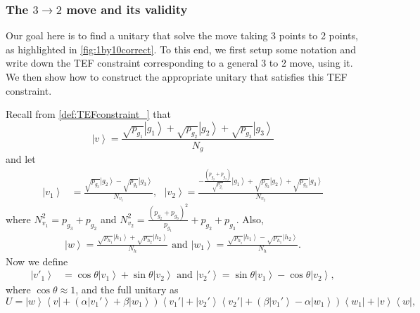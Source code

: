 \documentclass{theoretics}
\newcommand{\atul}[1]{#1} %
\begin{document}
\subsubsection{The \texorpdfstring{$3\to2$}{3 -> 2} move and its validity}\label{subsubsec:3to2}
\atul{Our goal here is to find a unitary that solve the move taking 3 points to 2 points, as highlighted in  \cref{fig:1by10correct}. To this end, we first setup some notation and write down the TEF constraint corresponding to a general 3 to 2 move, using it. We then show how to construct the appropriate unitary that satisfies this TEF constraint.} %


Recall \atul{from \cref{def:TEFconstraint_}} that
\begin{displaymath}
  \left|v\right\rangle =\frac{\sqrt{p_{g_{1}}}\left|g_{1}\right\rangle +\sqrt{p_{g_{2}}}\left|g_{2}\right\rangle +\sqrt{p_{g_{3}}}\left|g_{3}\right\rangle }{N_{g}}
\end{displaymath}
and let
\begin{align*}
  \left|v_{1}\right\rangle & =\frac{\sqrt{p_{g_{3}}}\left|g_{2}\right\rangle -\sqrt{p_{g_{2}}}\left|g_{3}\right\rangle }{N_{v_{1}}},\ \ \
  \left|v_{2}\right\rangle   =\frac{-\frac{(p_{g_{2}}+p_{g_{3}})}{\sqrt{p_{g_{1}}}}\left|g_{1}\right\rangle +\sqrt{p_{g_{2}}}\left|g_{2}\right\rangle +\sqrt{p_{g_{3}}}\left|g_{3}\right\rangle }{N_{v_{2}}}
\end{align*}
where $N_{v_{1}}^{2}=p_{g_{3}}+p_{g_{2}}$ and $N_{v_{2}}^{2}=\frac{(p_{g_{2}}+p_{g_{3}})^{2}}{p_{g_{1}}}+p_{g_{2}}+p_{g_{3}}$.
Also,
\begin{align*}
  \left|w\right\rangle  =\frac{\sqrt{p_{h_{1}}}\left|h_{1}\right\rangle +\sqrt{p_{h_{2}}}\left|h_{2}\right\rangle }{N_{h}} \text{ and }
  \left|w_{1}\right\rangle   =\frac{\sqrt{p_{h_{_{2}}}}\left|h_{1}\right\rangle -\sqrt{p_{h_{1}}}\left|h_{2}\right\rangle }{N_{h}}.
\end{align*}
Now we define
\begin{align*}
  \left|v'_{1}\right\rangle & =\cos\theta\left|v_{1}\right\rangle +\sin\theta\left|v_{2}\right\rangle \text{ and }
  \left|v_{2}'\right\rangle   =\sin\theta\left|v_{1}\right\rangle -\cos\theta\left|v_{2}\right\rangle,
\end{align*}
where $\cos\theta\approx 1$, and the full unitary as
\begin{displaymath}
  U=\left|w\right\rangle \left\langle v\right|+\left(\alpha\left|v_{1}'\right\rangle +\beta\left|w_{1}\right\rangle \right)\left\langle v_{1}'\right|+\left|v_{2}'\right\rangle \left\langle v_{2}'\right|+\left(\beta\left|v_{1}'\right\rangle -\alpha\left|w_{1}\right\rangle \right)\left\langle w_{1}\right|+\left|v\right\rangle \left\langle w\right|,
\end{displaymath}
\end{document}
